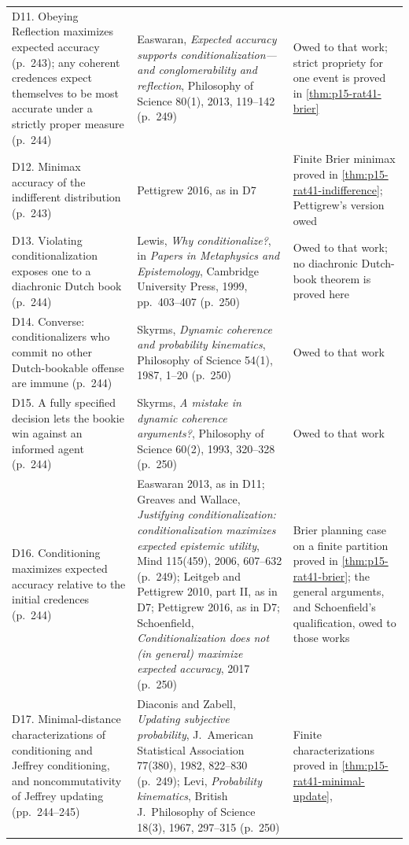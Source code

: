 \begin{longtable}{@{}p{.28\linewidth}p{.32\linewidth}p{.30\linewidth}@{}}
D11. Obeying Reflection maximizes expected accuracy (p.~243); any coherent
credences expect themselves to be most accurate under a strictly proper
measure (p.~244) &
Easwaran, \emph{Expected accuracy supports conditionalization---and
conglomerability and reflection}, Philosophy of Science 80(1), 2013,
119--142 (p.~249) &
Owed to that work; strict propriety for one event is proved in
\cref{thm:p15-rat41-brier} \\
D12. Minimax accuracy of the indifferent distribution (p.~243) &
Pettigrew 2016, as in D7 &
Finite Brier minimax proved in \cref{thm:p15-rat41-indifference};
Pettigrew's version owed \\
D13. Violating conditionalization exposes one to a diachronic Dutch book
(p.~244) &
Lewis, \emph{Why conditionalize?}, in \emph{Papers in Metaphysics and
Epistemology}, Cambridge University Press, 1999, pp.~403--407 (p.~250) &
Owed to that work; no diachronic Dutch-book theorem is proved here \\
D14. Converse: conditionalizers who commit no other Dutch-bookable offense
are immune (p.~244) &
Skyrms, \emph{Dynamic coherence and probability kinematics}, Philosophy of
Science 54(1), 1987, 1--20 (p.~250) &
Owed to that work \\
D15. A fully specified decision lets the bookie win against an informed
agent (p.~244) &
Skyrms, \emph{A mistake in dynamic coherence arguments?}, Philosophy of
Science 60(2), 1993, 320--328 (p.~250) &
Owed to that work \\
D16. Conditioning maximizes expected accuracy relative to the initial
credences (p.~244) &
Easwaran 2013, as in D11; Greaves and Wallace, \emph{Justifying
conditionalization: conditionalization maximizes expected epistemic
utility}, Mind 115(459), 2006, 607--632 (p.~249); Leitgeb and Pettigrew
2010, part II, as in D7; Pettigrew 2016, as in D7; Schoenfield,
\emph{Conditionalization does not (in general) maximize expected accuracy},
2017 (p.~250) &
Brier planning case on a finite partition proved in
\cref{thm:p15-rat41-brier}; the general arguments, and Schoenfield's
qualification, owed to those works \\
D17. Minimal-distance characterizations of conditioning and Jeffrey
conditioning, and noncommutativity of Jeffrey updating (pp.~244--245) &
Diaconis and Zabell, \emph{Updating subjective probability}, J.\ American
Statistical Association 77(380), 1982, 822--830 (p.~249); Levi,
\emph{Probability kinematics}, British J.\ Philosophy of Science 18(3),
1967, 297--315 (p.~250) &
Finite characterizations proved in \cref{thm:p15-rat41-minimal-update},

\end{longtable}
